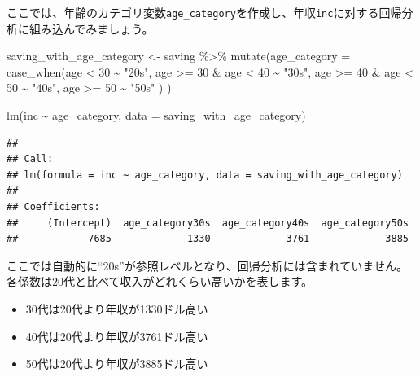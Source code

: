 \documentclass[
]{book}
\newenvironment{Shaded}{\begin{snugshade}}{\end{snugshade}}
\newcommand{\AttributeTok}[1]{\textcolor[rgb]{0.77,0.63,0.00}{#1}}
\newcommand{\DecValTok}[1]{\textcolor[rgb]{0.00,0.00,0.81}{#1}}
\newcommand{\FunctionTok}[1]{\textcolor[rgb]{0.00,0.00,0.00}{#1}}
\newcommand{\NormalTok}[1]{#1}
\newcommand{\OtherTok}[1]{\textcolor[rgb]{0.56,0.35,0.01}{#1}}
\newcommand{\SpecialCharTok}[1]{\textcolor[rgb]{0.00,0.00,0.00}{#1}}
\newcommand{\StringTok}[1]{\textcolor[rgb]{0.31,0.60,0.02}{#1}}
\providecommand{\tightlist}{%
  \setlength{\itemsep}{0pt}\setlength{\parskip}{0pt}}
\begin{document}
ここでは、年齢のカテゴリ変数\texttt{age\_category}を作成し、年収\texttt{inc}に対する回帰分析に組み込んでみましょう。

\begin{Shaded}
\begin{Highlighting}[]
\NormalTok{saving\_with\_age\_category }\OtherTok{\textless{}{-}}
\NormalTok{  saving }\SpecialCharTok{\%\textgreater{}\%}
    \FunctionTok{mutate}\NormalTok{(}\AttributeTok{age\_category =} \FunctionTok{case\_when}\NormalTok{(age }\SpecialCharTok{\textless{}} \DecValTok{30} \SpecialCharTok{\textasciitilde{}} \StringTok{"20s"}\NormalTok{,}
\NormalTok{                                    age }\SpecialCharTok{\textgreater{}=} \DecValTok{30} \SpecialCharTok{\&}\NormalTok{ age }\SpecialCharTok{\textless{}} \DecValTok{40} \SpecialCharTok{\textasciitilde{}} \StringTok{"30s"}\NormalTok{,}
\NormalTok{                                    age }\SpecialCharTok{\textgreater{}=} \DecValTok{40} \SpecialCharTok{\&}\NormalTok{ age }\SpecialCharTok{\textless{}} \DecValTok{50} \SpecialCharTok{\textasciitilde{}} \StringTok{"40s"}\NormalTok{,}
\NormalTok{                                    age }\SpecialCharTok{\textgreater{}=} \DecValTok{50} \SpecialCharTok{\textasciitilde{}} \StringTok{"50s"}
\NormalTok{                                    )}
\NormalTok{          )}

\FunctionTok{lm}\NormalTok{(inc }\SpecialCharTok{\textasciitilde{}}\NormalTok{ age\_category, }\AttributeTok{data =}\NormalTok{ saving\_with\_age\_category)}
\end{Highlighting}
\end{Shaded}

\begin{verbatim}
## 
## Call:
## lm(formula = inc ~ age_category, data = saving_with_age_category)
## 
## Coefficients:
##     (Intercept)  age_category30s  age_category40s  age_category50s  
##            7685             1330             3761             3885
\end{verbatim}

ここでは自動的に``20s''が参照レベルとなり、回帰分析には含まれていません。
各係数は20代と比べて収入がどれくらい高いかを表します。

\begin{itemize}
\tightlist
\item
  30代は20代より年収が1330ドル高い
\item
  40代は20代より年収が3761ドル高い
\item
  50代は20代より年収が3885ドル高い
\end{itemize}
\end{document}
